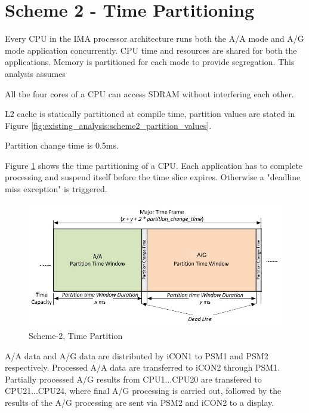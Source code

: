 \clearpage
\section{Scheme 2 - Time Partitioning}
\label{sec:scheme2}
Every CPU in the IMA processor architecture runs both the A/A mode and A/G mode application concurrently. CPU time and resources are shared for both the applications. Memory is partitioned for each mode to provide segregation. This analysis assumes
\begin{compactitem}
	\item All the four cores of a CPU can access SDRAM without interfering each other.
	\item L2 cache is statically partitioned at compile time, partition values are stated in Figure \ref{fig:existing_analysis:scheme2_partition_values}.
	\item Partition change time is 0.5ms. 
\end{compactitem} 

Figure \ref{fig:existing_analysis:scheme2_partition} shows the time partitioning of a CPU. Each application has to complete processing and suspend itself before the time slice expires. Otherwise a "deadline miss exception" is triggered.

\begin{figure}[h!]
	\centering
	\includegraphics[height=55mm]{figures/scheme2_partition}
	\caption{Scheme-2, Time Partition}
	\label{fig:existing_analysis:scheme2_partition}
\end{figure}

A/A data and A/G data are distributed by iCON1 to PSM1 and PSM2 respectively. Processed A/A data are transferred to iCON2 through PSM1. Partially processed A/G results from CPU1...CPU20 are transfered to CPU21...CPU24, where final A/G processing is carried out, followed by the results of the A/G processing are sent via PSM2 and iCON2 to a display.

